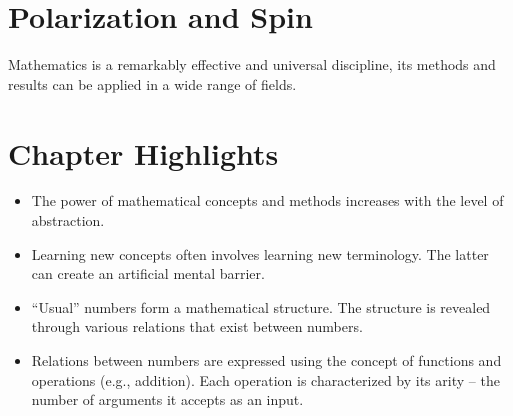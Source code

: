 \section{Polarization and Spin}
Mathematics is a remarkably effective and universal discipline, its
methods and
results can be applied in a wide range of fields.

\section*{Chapter Highlights}
{\chhc
  \it  
\begin{itemize}
\item The power of mathematical concepts and methods increases with
  the level of abstraction.
\item Learning new concepts often involves learning new
  terminology. The latter can create an artificial mental barrier.
\item ``Usual'' numbers form a mathematical structure. The structure
  is revealed through various relations that exist between numbers.
\item Relations between numbers are expressed using the concept of
  functions and operations (e.g., addition). Each operation is
  characterized by its arity -- the number of arguments it accepts as
  an input.
\end{itemize}


}
